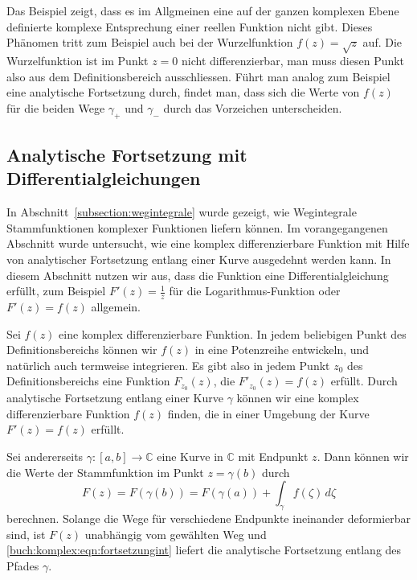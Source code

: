 Das Beispiel zeigt, dass es im Allgmeinen eine auf der ganzen komplexen
Ebene definierte komplexe Entsprechung einer reellen Funktion nicht gibt.
Dieses Phänomen tritt zum Beispiel auch bei der Wurzelfunktion
$f(z)=\sqrt{z}$ auf.
Die Wurzelfunktion ist im Punkt $z=0$ nicht differenzierbar, man muss diesen
Punkt also aus dem Definitionsbereich ausschliessen.
Führt man analog zum Beispiel eine analytische Fortsetzung durch,
findet man, dass sich die Werte von $f(z)$ für die beiden Wege $\gamma_+$
und $\gamma_-$ durch das Vorzeichen unterscheiden.

%
%
\subsection{Analytische Fortsetzung mit Differentialgleichungen
\label{komplex:analytische-fortsetzung-dgl}}
In Abschnitt~\ref{subsection:wegintegrale} wurde gezeigt, wie Wegintegrale
Stammfunktionen komplexer Funktionen liefern können.
Im vorangegangenen Abschnitt wurde untersucht, wie eine komplex differenzierbare
Funktion mit Hilfe von analytischer Fortsetzung entlang einer Kurve
ausgedehnt werden kann.
In diesem Abschnitt nutzen wir aus, dass die Funktion
eine Differentialgleichung erfüllt, zum Beispiel $F'(z)=\frac{1}{z}$
für die Logarithmus-Funktion oder $F'(z)=f(z)$ allgemein.

Sei $f(z)$ eine komplex differenzierbare Funktion.
In jedem beliebigen Punkt des Definitionsbereichs können wir $f(z)$
in eine Potenzreihe entwickeln, und natürlich auch termweise integrieren.
Es gibt also in jedem Punkt $z_0$ des Definitionsbereichs eine
Funktion $F_{z_0}(z)$, die $F'_{z_0}(z)=f(z)$ erfüllt.
Durch analytische Fortsetzung entlang einer Kurve $\gamma$ können
wir eine komplex differenzierbare Funktion $f(z)$ finden, die in einer
Umgebung der Kurve $F'(z)=f(z)$ erfüllt.

Sei andererseits $\gamma\colon[a,b]\to\mathbb C$ eine Kurve in $\mathbb C$
mit Endpunkt $z$.
Dann können wir die Werte der Stammfunktion im Punkt $z=\gamma(b)$ durch
\begin{equation}
F(z) = F(\gamma(b)) = F(\gamma(a))+\int_\gamma f(\zeta)\,d\zeta
\label{buch:komplex:eqn:fortsetzungint}
\end{equation}
berechnen.
Solange die Wege für verschiedene Endpunkte ineinander deformierbar sind,
ist $F(z)$ unabhängig vom gewählten Weg und 
\eqref{buch:komplex:eqn:fortsetzungint}
liefert die analytische Fortsetzung entlang des Pfades $\gamma$.

